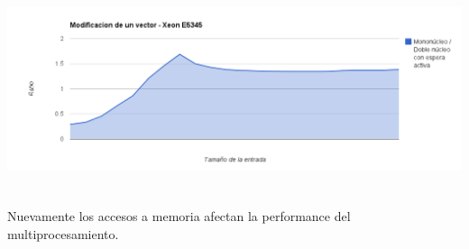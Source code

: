 	\begin{center}
	    \includegraphics[height=6cm]{images/xeon_vector_sum.png}
	\end{center}

	Nuevamente los accesos a memoria afectan la performance del multiprocesamiento.

